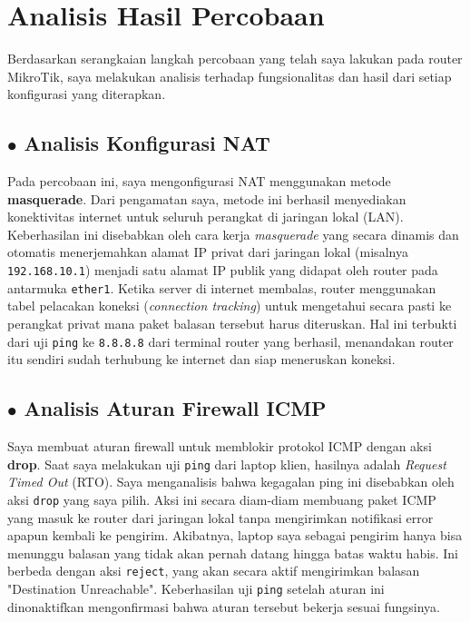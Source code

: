 \newpage
\section{Analisis Hasil Percobaan}
Berdasarkan serangkaian langkah percobaan yang telah saya lakukan pada router MikroTik, saya melakukan analisis terhadap fungsionalitas dan hasil dari setiap konfigurasi yang diterapkan.

\subsection*{$\bullet$ Analisis Konfigurasi NAT}
Pada percobaan ini, saya mengonfigurasi NAT menggunakan metode \textbf{masquerade}. Dari pengamatan saya, metode ini berhasil menyediakan konektivitas internet untuk seluruh perangkat di jaringan lokal (LAN). Keberhasilan ini disebabkan oleh cara kerja \textit{masquerade} yang secara dinamis dan otomatis menerjemahkan alamat IP privat dari jaringan lokal (misalnya \texttt{192.168.10.1}) menjadi satu alamat IP publik yang didapat oleh router pada antarmuka \texttt{ether1}. Ketika server di internet membalas, router menggunakan tabel pelacakan koneksi (\textit{connection tracking}) untuk mengetahui secara pasti ke perangkat privat mana paket balasan tersebut harus diteruskan. Hal ini terbukti dari uji \texttt{ping} ke \texttt{8.8.8.8} dari terminal router yang berhasil, menandakan router itu sendiri sudah terhubung ke internet dan siap meneruskan koneksi.

\subsection*{$\bullet$ Analisis Aturan Firewall ICMP}
Saya membuat aturan firewall untuk memblokir protokol ICMP dengan aksi \textbf{drop}. Saat saya melakukan uji \texttt{ping} dari laptop klien, hasilnya adalah \textit{Request Timed Out} (RTO). Saya menganalisis bahwa kegagalan ping ini disebabkan oleh aksi \texttt{drop} yang saya pilih. Aksi ini secara diam-diam membuang paket ICMP yang masuk ke router dari jaringan lokal tanpa mengirimkan notifikasi error apapun kembali ke pengirim. Akibatnya, laptop saya sebagai pengirim hanya bisa menunggu balasan yang tidak akan pernah datang hingga batas waktu habis. Ini berbeda dengan aksi \texttt{reject}, yang akan secara aktif mengirimkan balasan "Destination Unreachable". Keberhasilan uji \texttt{ping} setelah aturan ini dinonaktifkan mengonfirmasi bahwa aturan tersebut bekerja sesuai fungsinya.

